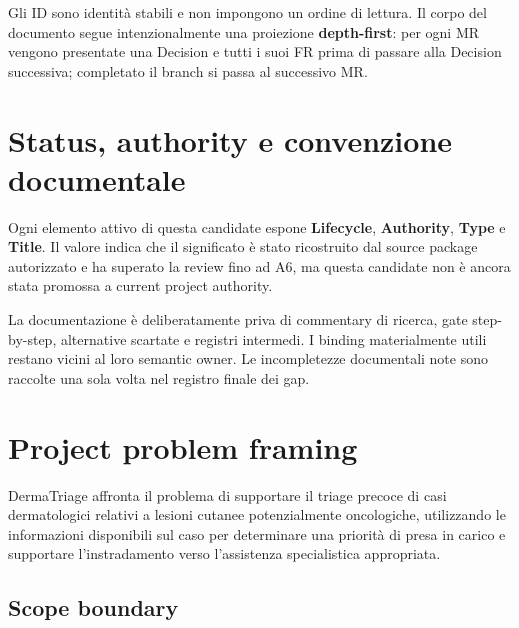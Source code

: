 \documentclass[11pt,a4paper]{article}
\begin{document}
\begin{statusbox}[title={Reading convention}]
Gli ID sono identità stabili e non impongono un ordine di lettura. Il corpo del documento segue intenzionalmente una proiezione \textbf{depth-first}: per ogni MR vengono presentate una Decision e tutti i suoi FR prima di passare alla Decision successiva; completato il branch si passa al successivo MR.
\end{statusbox}

\tableofcontents
\clearpage

\section{Status, authority e convenzione documentale}

\begin{projectbox}[title={Authority statement}]
Ogni elemento attivo di questa candidate espone \textbf{Lifecycle}, \textbf{Authority}, \textbf{Type} e \textbf{Title}. Il valore \candidateauthority{} indica che il significato è stato ricostruito dal source package autorizzato e ha superato la review fino ad A6, ma questa candidate non è ancora stata promossa a current project authority.
\end{projectbox}

La documentazione è deliberatamente priva di commentary di ricerca, gate step-by-step, alternative scartate e registri intermedi. I binding materialmente utili restano vicini al loro semantic owner. Le incompletezze documentali note sono raccolte una sola volta nel registro finale dei gap.

\section{Project problem framing}

\begin{projectbox}
DermaTriage affronta il problema di supportare il triage precoce di casi dermatologici relativi a lesioni cutanee potenzialmente oncologiche, utilizzando le informazioni disponibili sul caso per determinare una priorità di presa in carico e supportare l'instradamento verso l'assistenza specialistica appropriata.
\end{projectbox}

\subsection{Scope boundary}
\end{document}
